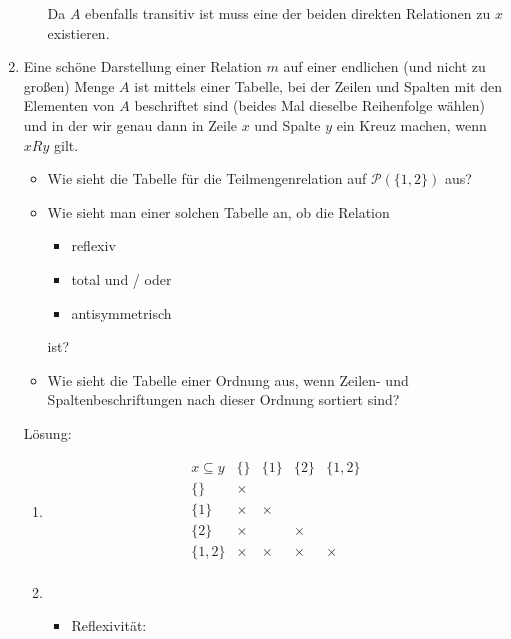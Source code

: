 \documentclass[main.tex]{subfiles}
\begin{document}
\begin{enumerate}
\begin{enumerate}
		            Da \( A \) ebenfalls transitiv ist muss eine der beiden direkten Relationen zu \( x \)
		            existieren.
	      \end{enumerate}
	\item Eine schöne Darstellung einer Relation \( m \) auf einer endlichen (und nicht zu
	      großen) Menge \( A \) ist mittels einer Tabelle, bei der Zeilen und Spalten mit den
	      Elementen von \( A \) beschriftet sind (beides Mal dieselbe Reihenfolge wählen)
	      und in der wir genau dann in Zeile \( x \) und Spalte \( y \) ein Kreuz machen, wenn
	      \( xRy \) gilt.
	      \begin{itemize}
		      \item  Wie sieht die Tabelle für die Teilmengenrelation auf \( \mathcal{P}(\{ 1, 2 \}) \) aus?
		      \item Wie sieht man einer solchen Tabelle an, ob die Relation
		            \begin{itemize}
			            \item reflexiv
			            \item total und / oder
			            \item antisymmetrisch
		            \end{itemize}
		            ist?
		      \item Wie sieht die Tabelle einer Ordnung aus, wenn Zeilen- und Spaltenbeschriftungen
		            nach dieser Ordnung sortiert sind?
	      \end{itemize}

	      Lösung:
	      \begin{enumerate}
		      \item
		            \[
			            \begin{array}{ c|c|c|c|c }
				            x \subseteq y & \{\}   & \{ 1 \} & \{ 2 \} & \{ 1,2 \} \\
				            \hline
				            \{\}          & \times &         &         &           \\
				            \hline
				            \{1\}         & \times & \times  &         &           \\
				            \hline
				            \{2\}         & \times &         & \times  &           \\
				            \hline
				            \{1,2\}       & \times & \times  & \times  & \times    \\
			            \end{array}
		            \]
		      \item
		            \begin{itemize}
			            \item Reflexivität:


\end{itemize}
\end{enumerate}
\end{enumerate}
\end{document}
